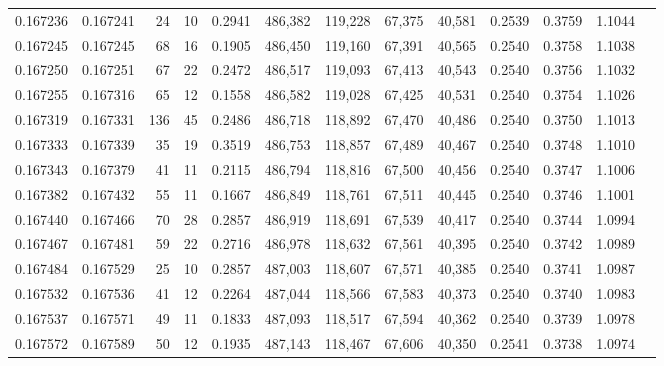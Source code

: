 \begin{tabular}{rrrrrrrrrrrrr}
0.167236 & 0.167241 &    24 &  10 &                                     0.2941 & 486,382 & 119,228 &  67,375 &  40,581 & 0.2539 & 0.3759 & 1.1044 \\
0.167245 & 0.167245 &    68 &  16 &                                     0.1905 & 486,450 & 119,160 &  67,391 &  40,565 & 0.2540 & 0.3758 & 1.1038 \\
0.167250 & 0.167251 &    67 &  22 &                                     0.2472 & 486,517 & 119,093 &  67,413 &  40,543 & 0.2540 & 0.3756 & 1.1032 \\
0.167255 & 0.167316 &    65 &  12 &                                     0.1558 & 486,582 & 119,028 &  67,425 &  40,531 & 0.2540 & 0.3754 & 1.1026 \\
0.167319 & 0.167331 &   136 &  45 &                                     0.2486 & 486,718 & 118,892 &  67,470 &  40,486 & 0.2540 & 0.3750 & 1.1013 \\
0.167333 & 0.167339 &    35 &  19 &                                     0.3519 & 486,753 & 118,857 &  67,489 &  40,467 & 0.2540 & 0.3748 & 1.1010 \\
0.167343 & 0.167379 &    41 &  11 &                                     0.2115 & 486,794 & 118,816 &  67,500 &  40,456 & 0.2540 & 0.3747 & 1.1006 \\
0.167382 & 0.167432 &    55 &  11 &                                     0.1667 & 486,849 & 118,761 &  67,511 &  40,445 & 0.2540 & 0.3746 & 1.1001 \\
0.167440 & 0.167466 &    70 &  28 &                                     0.2857 & 486,919 & 118,691 &  67,539 &  40,417 & 0.2540 & 0.3744 & 1.0994 \\
0.167467 & 0.167481 &    59 &  22 &                                     0.2716 & 486,978 & 118,632 &  67,561 &  40,395 & 0.2540 & 0.3742 & 1.0989 \\
0.167484 & 0.167529 &    25 &  10 &                                     0.2857 & 487,003 & 118,607 &  67,571 &  40,385 & 0.2540 & 0.3741 & 1.0987 \\
0.167532 & 0.167536 &    41 &  12 &                                     0.2264 & 487,044 & 118,566 &  67,583 &  40,373 & 0.2540 & 0.3740 & 1.0983 \\
0.167537 & 0.167571 &    49 &  11 &                                     0.1833 & 487,093 & 118,517 &  67,594 &  40,362 & 0.2540 & 0.3739 & 1.0978 \\
0.167572 & 0.167589 &    50 &  12 &                                     0.1935 & 487,143 & 118,467 &  67,606 &  40,350 & 0.2541 & 0.3738 & 1.0974 \\

\end{tabular}
